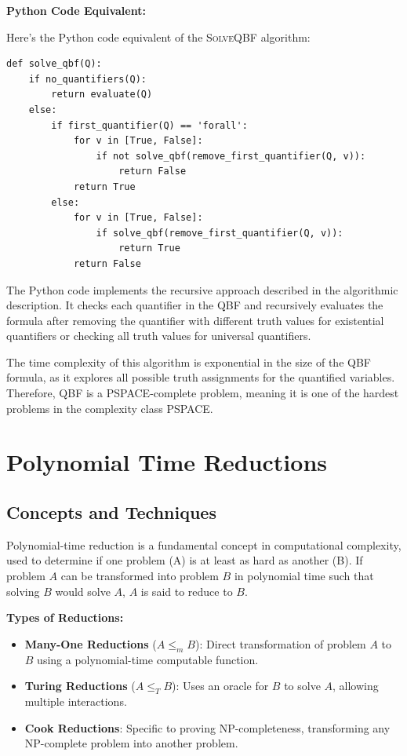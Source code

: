 \FloatBarrier

\textbf{Python Code Equivalent:}

Here's the Python code equivalent of the \textsc{SolveQBF} algorithm:
\FloatBarrier
\begin{lstlisting}
def solve_qbf(Q):
    if no_quantifiers(Q):
        return evaluate(Q)
    else:
        if first_quantifier(Q) == 'forall':
            for v in [True, False]:
                if not solve_qbf(remove_first_quantifier(Q, v)):
                    return False
            return True
        else:
            for v in [True, False]:
                if solve_qbf(remove_first_quantifier(Q, v)):
                    return True
            return False
\end{lstlisting}
\FloatBarrier
The Python code implements the recursive approach described in the algorithmic description. It checks each quantifier in the QBF and recursively evaluates the formula after removing the quantifier with different truth values for existential quantifiers or checking all truth values for universal quantifiers.

The time complexity of this algorithm is exponential in the size of the QBF formula, as it explores all possible truth assignments for the quantified variables. Therefore, QBF is a PSPACE-complete problem, meaning it is one of the hardest problems in the complexity class PSPACE.


\section{Polynomial Time Reductions}

\subsection{Concepts and Techniques}
Polynomial-time reduction is a fundamental concept in computational complexity, used to determine if one problem (A) is at least as hard as another (B). If problem \(A\) can be transformed into problem \(B\) in polynomial time such that solving \(B\) would solve \(A\), \(A\) is said to reduce to \(B\).

\textbf{Types of Reductions:}
\begin{itemize}
    \item \textbf{Many-One Reductions} (\(A \leq_m B\)): Direct transformation of problem \(A\) to \(B\) using a polynomial-time computable function.
    \item \textbf{Turing Reductions} (\(A \leq_T B\)): Uses an oracle for \(B\) to solve \(A\), allowing multiple interactions.
    \item \textbf{Cook Reductions}: Specific to proving NP-completeness, transforming any NP-complete problem into another problem.
\end{itemize}


